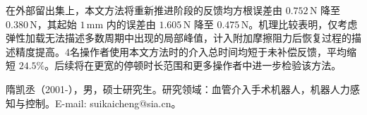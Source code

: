 \documentclass{JQR_LaTeX_Template-0507/JQRnew}
\begin{document}
在外部留出集上，本文方法将重新推进阶段的反馈均方根误差由 $0.752\,\mathrm{N}$ 降至 $0.380\,\mathrm{N}$，其起始 $1\,\mathrm{mm}$ 内的误差由 $1.605\,\mathrm{N}$ 降至 $0.475\,\mathrm{N}$。机理比较表明，仅考虑弹性加载无法描述多数周期中出现的局部峰值，计入附加摩擦阻力后恢复过程的描述精度提高。4名操作者使用本文方法时的介入总时间均短于未补偿反馈，平均缩短 $24.5\%$。后续将在更宽的停顿时长范围和更多操作者中进一步检验该方法。



\noindent




\begin{AuthorIntroduction}
\Intro 隋凯丞（2001-），男，硕士研究生。研究领域：血管介入手术机器人，机器人力感知与控制。E-mail: suikaicheng@sia.cn。


\end{AuthorIntroduction}

\balance
\end{document}
